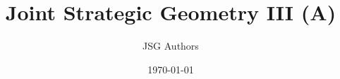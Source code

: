 \documentclass[11pt]{article}
\title{Joint Strategic Geometry III (A)}
\author{JSG Authors}
\date{\today}
\begin{document}
\maketitle

\newcommand{\JSGWrap}{A}
















\nocite{*}
\printbibliography
\end{document}
